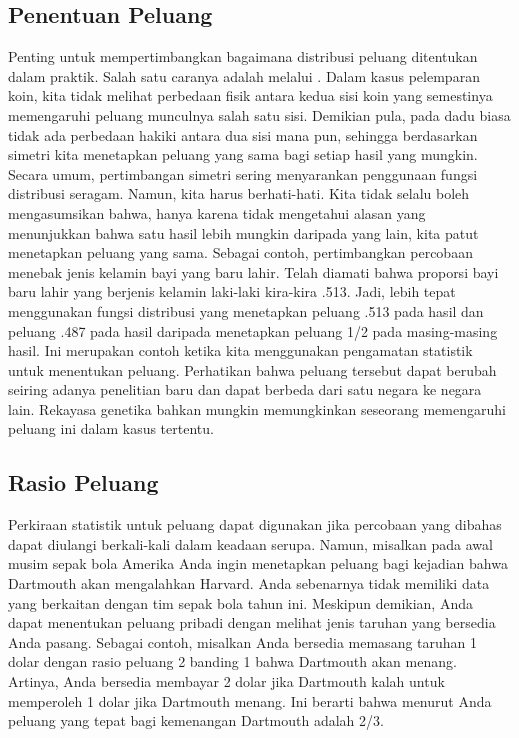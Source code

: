\subsection*{Penentuan Peluang}

Penting untuk mempertimbangkan bagaimana distribusi peluang
ditentukan dalam praktik.  Salah satu caranya adalah melalui .  Dalam kasus
pelemparan koin, kita tidak melihat perbedaan fisik antara kedua sisi
koin
yang semestinya memengaruhi peluang munculnya salah satu sisi. 
Demikian pula, pada dadu biasa tidak ada perbedaan hakiki antara
dua sisi mana pun, sehingga berdasarkan simetri kita menetapkan peluang yang sama bagi
setiap
hasil yang mungkin.  Secara umum, pertimbangan simetri sering menyarankan penggunaan
fungsi distribusi seragam.  Namun, kita harus berhati-hati.  Kita tidak selalu boleh mengasumsikan
bahwa,
hanya karena tidak mengetahui alasan yang menunjukkan bahwa satu hasil lebih
mungkin daripada yang lain, kita patut menetapkan peluang yang sama.  Sebagai
contoh, pertimbangkan percobaan menebak jenis kelamin bayi yang baru lahir.  Telah
diamati bahwa proporsi bayi baru lahir yang berjenis kelamin laki-laki kira-kira
.513.  Jadi, lebih tepat menggunakan fungsi distribusi yang
menetapkan peluang .513 pada hasil  dan peluang .487 pada
hasil
 daripada menetapkan peluang 1/2 pada masing-masing hasil.  Ini merupakan
contoh ketika kita menggunakan pengamatan statistik untuk menentukan peluang. 
Perhatikan
bahwa peluang tersebut dapat berubah seiring adanya penelitian baru dan dapat berbeda dari
satu negara
ke negara lain.  Rekayasa genetika bahkan mungkin memungkinkan seseorang memengaruhi
peluang ini dalam kasus tertentu.

\subsection*{Rasio Peluang}

Perkiraan statistik untuk peluang dapat digunakan jika percobaan yang
dibahas dapat diulangi berkali-kali dalam keadaan serupa. 
Namun, misalkan pada awal musim sepak bola Amerika Anda ingin
menetapkan
peluang bagi kejadian bahwa Dartmouth akan mengalahkan Harvard.  
Anda sebenarnya tidak
memiliki data yang berkaitan dengan tim sepak bola tahun ini.  Meskipun demikian, Anda dapat
menentukan peluang pribadi dengan melihat jenis taruhan yang
bersedia
Anda pasang.  Sebagai contoh, misalkan Anda bersedia memasang taruhan 1
dolar dengan rasio peluang 2 banding 1 bahwa Dartmouth akan menang.  Artinya, Anda bersedia
membayar
2 dolar jika Dartmouth kalah untuk memperoleh 1 dolar jika
Dartmouth
menang.  Ini berarti bahwa menurut Anda peluang yang tepat bagi kemenangan Dartmouth
adalah 2/3.

